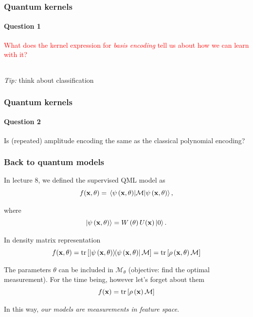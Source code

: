 \documentclass[aspectratio=43]{beamer}
\begin{document}
\begin{frame}
  \frametitle{Quantum kernels}
  \framesubtitle{Question 1}

  \centering
  \textcolor{red}{What does the kernel expression for \emph{basis encoding} tell us about how we can learn with it?}
  
  \ \\
  \emph{Tip:} think about classification

\end{frame}


\begin{frame}
  \frametitle{Quantum kernels}
  \framesubtitle{Question 2}

  \centering
  \color{red} Is (repeated) amplitude encoding the same as the classical polynomial encoding?

\end{frame}


\begin{frame}
  \frametitle{Back to quantum models}

  In lecture 8, we defined the supervised QML model as
  \[f(\mathbf{x}, \theta) = \ev{\mathcal{M}}{\psi\left( \mathbf{x}, \theta \right)},\]

  where
  \[\ket{\psi\left( \mathbf{x}, \theta \right)} = W\left( \theta \right) U(\mathbf{x}) \ket{0}.\]

  In density matrix representation
  \[f(\mathbf{x}, \theta) = \tr\left[ \ketbra{\psi\left( \mathbf{x},\theta \right)}\mathcal{M} \right] = \tr\left[\rho\left( \mathbf{x},\theta \right)\mathcal{M}\right]\]

  The parameters $\theta$ can be included in $\mathcal{M}_\theta$ (objective: find the optimal measurement). For the time being, however let's forget about them
  \[f(\mathbf{x})=\tr\left[\rho\left( \mathbf{x} \right)\mathcal{M}\right]\]

  In this way, \emph{our models are measurements in feature space}.

\end{frame}
\end{document}
